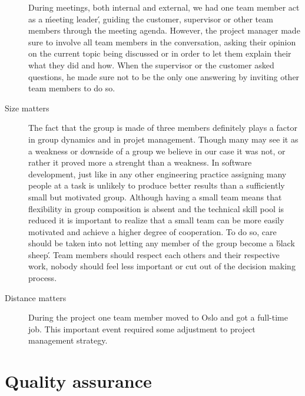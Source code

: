 \begin{description}
During meetings, both internal and external, we had one team member
act as a \'meeting leader\', guiding the customer, supervisor or other team members through
the meeting agenda. However, the project manager made sure to involve all team members
in the conversation, asking their opinion on the current topic being discussed
or in order to let them explain their what they did and how.
When the supervisor or the customer asked questions, he made sure not to be the only one
answering by inviting other team members to do so.

\item[Size matters]
The fact that the group is made of three members definitely plays a factor in group dynamics
and in projet management. Though many may see it as a weakness or downside of a group we believe
in our case it was not, or rather it proved more a strenght than a weakness.
In software development, just like in any other engineering practice assigning many people
at a task is unlikely to produce better results than a sufficiently small but motivated group.
Although having a small team means that flexibility in group composition is absent and
the technical skill pool is reduced it is important to realize that a small team
can be more easily motivated and achieve a higher degree of cooperation.
To do so, care should be taken into not letting any member of the group become
a \'black sheep\'. Team members should respect each others and their respective work,
nobody should feel less important or cut out of the decision making process.

\item[Distance matters]
During the project one team member moved to Oslo and got a full-time job.
This important event required some adjustment to project management strategy.



\end{description}







\section{Quality assurance}
\label{section:qa}

